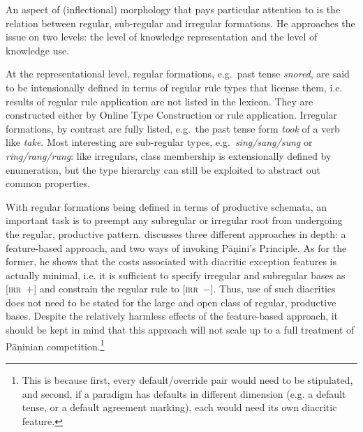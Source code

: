 \documentclass[output=paper
	        ,collection
	        ,collectionchapter
 	        ,biblatex
                ,babelshorthands
                ,newtxmath
                ,draftmode
                ,colorlinks, citecolor=brown
]{langscibook}
\begin{document}
{An aspect of (inflectional) morphology that \citet{Koenig99} pays
particular attention to is the relation between regular, sub-regular
and irregular formations. He approaches the issue on two levels: the
level of knowledge representation and the level of knowledge use. 

At the representational level, regular formations, e.g.\ past tense
\textit{snored}, are said to be intensionally defined in terms of
regular rule types that license them, i.e. results of regular rule
application are not listed in the lexicon. They are constructed either
by Online Type Construction or rule application.  Irregular
formations, by contrast are fully listed, e.g.\ the past tense form
\textit{took} of a verb like \textit{take}. Most interesting are
sub-regular types, e.g.\ \textit{sing/sang/sung} or
\textit{ring/rang/rung}: like irregulars, class membership is
extensionally defined by enumeration, but the type hierarchy can still
be exploited to abstract out common properties.

With regular formations being defined in terms of productive schemata,
an important task is to preempt any subregular or irregular root from
undergoing the regular, productive pattern. \citet{Koenig99} discusses
three different approaches in depth: a feature-based approach, and two
ways of invoking Pāṇini's Principle. As for the former, he shows that
the costs associated with diacritic exception features is actually
minimal, i.e. it is sufficient to specify irregular and subregular
bases as \textsc{[irr~$+$]} and constrain the regular rule to
\textsc{[irr~$-$]}. Thus, use of such diacritics does not need to be
stated for the large and open class of regular, productive
bases. Despite the relatively harmless effects of the feature-based
approach, it should be kept in mind that this approach will not scale
up to a full treatment of Pāṇinian competition.\footnote{This is
  because first, every default/override pair would need to be
  stipulated, and second, if a paradigm has defaults in different
  dimension (e.g. a default tense, or a default agreement marking),
  each would need its own diacritic feature.}

}
\end{document}

